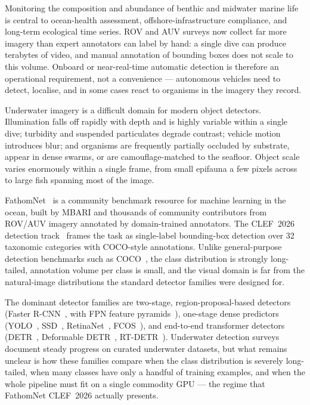 \documentclass[11pt,a4paper,twocolumn]{article}
\begin{document}
Monitoring the composition and abundance of benthic and midwater marine
life is central to ocean-health assessment, offshore-infrastructure
compliance, and long-term ecological time series. ROV and AUV surveys now
collect far more imagery than expert annotators can label by hand: a single
dive can produce terabytes of video, and manual annotation of bounding
boxes does not scale to this volume. Onboard or near-real-time automatic
detection is therefore an operational requirement, not a convenience ---
autonomous vehicles need to detect, localise, and in some cases react to
organisms in the imagery they record.

Underwater imagery is a difficult domain for modern object detectors.
Illumination falls off rapidly with depth and is highly variable within a
single dive; turbidity and suspended particulates degrade contrast;
vehicle motion introduces blur; and organisms are frequently partially
occluded by substrate, appear in dense swarms, or are camouflage-matched
to the seafloor. Object scale varies enormously within a single frame,
from small epifauna a few pixels across to large fish spanning most of
the image.

FathomNet~\cite{fathomnet2022} is a community benchmark resource for
machine learning in the ocean, built by MBARI and thousands of community
contributors from ROV/AUV imagery annotated by domain-trained annotators.
The CLEF~2026 detection track~\cite{fathomnet-clef-2026} frames the task
as single-label bounding-box detection over 32 taxonomic categories with
COCO-style annotations. Unlike general-purpose detection benchmarks such
as COCO~\cite{coco2014}, the class distribution is strongly long-tailed,
annotation volume per class is small, and the visual domain is far from
the natural-image distributions the standard detector families were
designed for.

The dominant detector families are two-stage, region-proposal-based
detectors (Faster R-CNN~\cite{fasterrcnn2015}, with FPN feature
pyramids~\cite{fpn2017}), one-stage dense predictors
(YOLO~\cite{yolo2016}, SSD~\cite{ssd2016}, RetinaNet~\cite{retinanet2017},
FCOS~\cite{fcos2019}), and end-to-end transformer detectors
(DETR~\cite{detr2020}, Deformable DETR~\cite{deformable-detr2021},
RT-DETR~\cite{rtdetr2024}). Underwater detection surveys
\cite{underwater-survey} document steady progress on curated underwater
datasets, but what remains unclear is how these families compare when the
class distribution is severely long-tailed, when many classes have only a
handful of training examples, and when the whole pipeline must fit on a
single commodity GPU --- the regime that FathomNet CLEF~2026 actually
presents.
\end{document}
